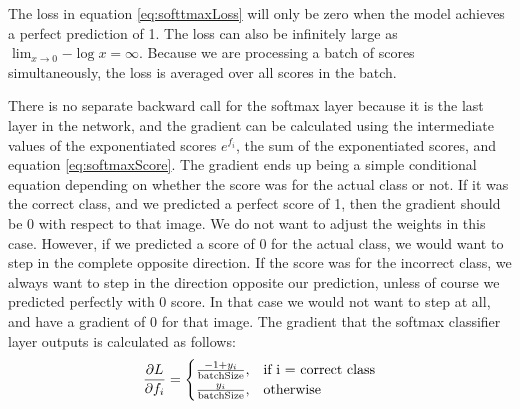 \documentclass[conference]{IEEEtran}
\begin{document}
The loss in equation \ref{eq:softtmaxLoss} will only be zero when the model achieves a perfect prediction of 1. The loss can also be infinitely large as $\lim_{x\to 0}{-\log{x}} = \infty$. Because we are processing a batch of scores simultaneously, the loss is averaged over all scores in the batch.

There is no separate backward call for the softmax layer because it is the last layer in the network, and the gradient can be calculated using the intermediate values of the exponentiated scores $e^{f_i}$, the sum of the exponentiated scores, and equation \ref{eq:softmaxScore}. The gradient ends up being a simple conditional equation depending on whether the score was for the actual class or not. If it was the correct class, and we predicted a perfect score of 1, then the gradient should be 0 with respect to that image. We do not want to adjust the weights in this case. However, if we predicted a score of 0 for the actual class, we would want to step in the complete opposite direction. If the score was for the incorrect class, we always want to step in the direction opposite our prediction, unless of course we predicted perfectly with 0 score. In that case we would not want to step at all, and have a gradient of 0 for that image. The gradient that the softmax classifier layer outputs is calculated as follows:
\begin{equation}\label{eq:softmaxDeriv}
\frac{\partial L}{\partial f_i} = \begin{cases}
    \frac{-1 + y_i}{\text{batchSize}}, & \text{if } $i =$ \text{ correct class} \\
    \frac{y_i}{\text{batchSize}}, & \text{otherwise} \\
\end{cases}
\end{equation}
\end{document}
